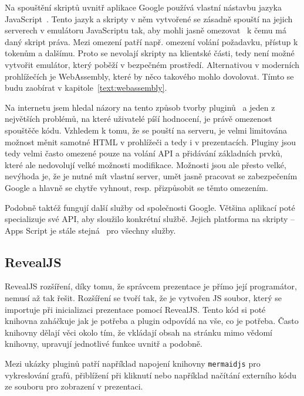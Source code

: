 Na spouštění skriptů uvnitř aplikace Google používá vlastní nástavbu jazyka JavaScript~\cite{google_apps}.
Tento jazyk a skripty v něm vytvořené se zásadně spouští na jejich serverech v emulátoru JavaScriptu tak, aby mohli jasně omezovat~\cite{google_apps} k čemu má daný skript práva. 
Mezi omezení patří např. omezení volání požadavku, přístup k tokenům a dalšímu.
Proto se nevolají skripty na klientské části, tedy není možné vytvořit emulátor, který poběží v bezpečném prostředí.
Alternativou v moderních prohlížečích je WebAssembly, které by něco takového mohlo dovolovat.
Tímto se budu zaobírat v kapitole~\ref{text:webassembly}.

Na internetu jsem hledal názory na tento způsob tvorby pluginů~\cite{google_apps_script_redit} a jeden z největších problémů, na které uživatelé píší hodnocení, je právě omezenost spouštěče kódu.
Vzhledem k tomu, že se pouští na serveru, je velmi limitována možnost měnit samotné HTML v prohlížeči a tedy i v prezentacích.
Pluginy jsou tedy velmi často omezené pouze na volání API a přidávání základních prvků, které ale nedovolují velké možnosti modifikace.
Možnosti jsou ale přesto velké, nevýhoda je, že je nutné mít vlastní server, umět jasně pracovat se zabezpečením Google a hlavně se chytře vyhnout, resp. přizpůsobit se těmto omezením.

Podobně taktéž fungují další služby od společnosti Google.
Většina aplikací poté specializuje své API, aby sloužilo konkrétní službě.
Jejich platforma na skripty -- Apps Script je stále stejná~\cite{google_apps_script_redit, google_apps} pro všechny služby.

\subsection{RevealJS}

RevealJS rozšíření, díky tomu, že správcem prezentace je přímo její programátor, nemusí až tak řešit.
Rozšíření se tvoří tak, že je vytvořen JS soubor, který se importuje při inicializaci prezentace pomocí RevealJS.
Tento kód si poté knihovna zaháčkuje jak je potřeba a plugin odpovídá na vše, co je potřeba.
Často knihovny dělají věci okolo tím, že vkládají obsah na stránku mimo vědomí knihovny, upravují jednotlivé funkce uvnitř a podobně.

Mezi ukázky pluginů patří například napojení knihovny \texttt{mermaidjs} pro vykreslování grafů, přiblížení při kliknutí nebo například načítání externího kódu ze souboru pro zobrazení v prezentaci.

